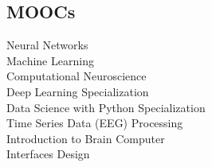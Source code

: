 \documentclass[]{deedy-resume-openfont}
\begin{document}
\begin{minipage}[t]{0.33\textwidth}
\subsection{MOOCs}
Neural Networks \\
Machine Learning \\
Computational Neuroscience \\
Deep Learning Specialization \\
Data Science with Python Specialization \\
Time Series Data (EEG) Processing \\
Introduction to Brain Computer \\
Interfaces Design\\


%
%

\end{minipage} 
\hfill
\end{document}
